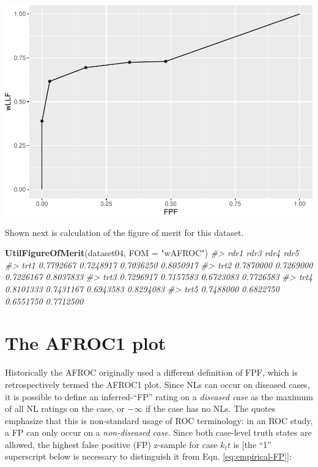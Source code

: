 \documentclass[
]{book}
\newenvironment{Shaded}{\begin{snugshade}}{\end{snugshade}}
\newcommand{\CommentTok}[1]{\textcolor[rgb]{0.56,0.35,0.01}{\textit{#1}}}
\newcommand{\DataTypeTok}[1]{\textcolor[rgb]{0.13,0.29,0.53}{#1}}
\newcommand{\KeywordTok}[1]{\textcolor[rgb]{0.13,0.29,0.53}{\textbf{#1}}}
\newcommand{\NormalTok}[1]{#1}
\newcommand{\StringTok}[1]{\textcolor[rgb]{0.31,0.60,0.02}{#1}}
\begin{document}
\includegraphics{03-empirical_files/figure-latex/unnamed-chunk-10-1.pdf}

Shown next is calculation of the figure of merit for this dataset.

\begin{Shaded}
\begin{Highlighting}[]
\KeywordTok{UtilFigureOfMerit}\NormalTok{(dataset04, }\DataTypeTok{FOM =} \StringTok{"wAFROC"}\NormalTok{)}
\CommentTok{#>           rdr1      rdr3      rdr4      rdr5}
\CommentTok{#> trt1 0.7792667 0.7248917 0.7036250 0.8050917}
\CommentTok{#> trt2 0.7870000 0.7269000 0.7226167 0.8037833}
\CommentTok{#> trt3 0.7296917 0.7157583 0.6723083 0.7726583}
\CommentTok{#> trt4 0.8101333 0.7431167 0.6943583 0.8294083}
\CommentTok{#> trt5 0.7488000 0.6822750 0.6551750 0.7712500}
\end{Highlighting}
\end{Shaded}

\hypertarget{empirical-AFROC1}{%
\section{The AFROC1 plot}\label{empirical-AFROC1}}

Historically the AFROC originally used a different definition of FPF, which is retrospectively termed the AFROC1 plot. Since NLs can occur on diseased cases, it is possible to define an inferred-``FP'' rating on a \emph{diseased case} as the maximum of all NL ratings on the case, or \(-\infty\) if the case has no NLs. The quotes emphasize that this is non-standard usage of ROC terminology: in an ROC study, a FP can only occur on a \emph{non-diseased case}. Since both case-level truth states are allowed, the highest false positive (FP) z-sample for case \(k_t t\) is {[}the ``1'' superscript below is necessary to distinguish it from Eqn. \eqref{eq:empirical-FP}{]}:
\end{document}
